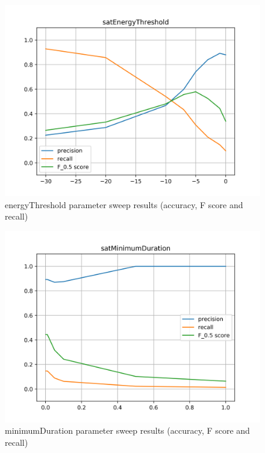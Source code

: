 \begin{figure}[!ht]
	\includegraphics[clip,width=\columnwidth]{Figures/satEnergyThreshold.png}%
	\caption{energyThreshold parameter sweep results (accuracy, F score and recall)}
	\label{fig:satEnergyThreshold}
\end{figure}

\begin{figure}[!ht]
	\includegraphics[clip,width=\columnwidth]{Figures/satMinimumDuration.png}%
	\caption{minimumDuration parameter sweep results (accuracy, F score and recall)}
	\label{fig:satMinimumDuration}
\end{figure}

